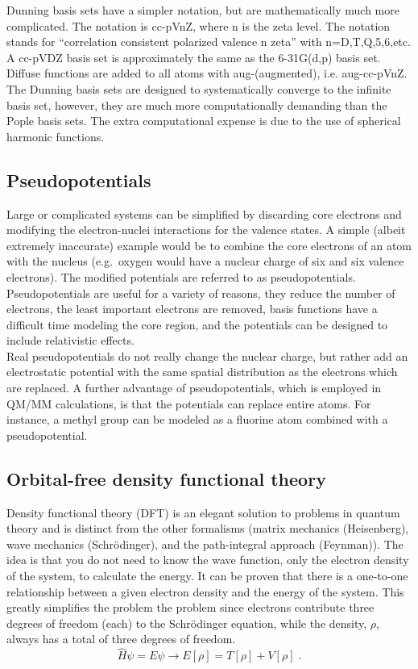 \documentclass[12pt]{report}
\begin{document}
Dunning basis sets have a simpler notation, but are mathematically much more
complicated.
The notation is cc-pVnZ, where n is the zeta level.
The notation stands for ``correlation consistent polarized valence n zeta''
with n=D,T,Q,5,6,etc.
A cc-pVDZ basis set is approximately the same as the 6-31G(d,p) basis set.
Diffuse functions are added to all atoms with aug-(augmented), i.e.
aug-cc-pVnZ.
The Dunning basis sets are designed to systematically converge to the infinite
basis set, however, they are much more computationally demanding than the
Pople basis sets.
The extra computational expense is due to the use of spherical harmonic
functions.

\subsection{Pseudopotentials}

Large or complicated systems can be simplified by discarding core electrons
and modifying the electron-nuclei interactions for the valence states.
A simple (albeit extremely inaccurate) example would be to combine the core
electrons of an atom with the nucleus (e.g.\ oxygen would have a nuclear charge
of six and six valence electrons).
The modified potentials are referred to as pseudopotentials.
Pseudopotentials are useful for a variety of reasons, they reduce the number
of electrons, the least important electrons are removed, basis functions have
a difficult time modeling the core region, and the potentials can be designed
to include relativistic effects. \\

Real pseudopotentials do not really change the nuclear charge, but rather add
an electrostatic potential with the same spatial distribution as the electrons
which are replaced.
A further advantage of pseudopotentials, which is employed in QM/MM
calculations, is that the potentials can replace entire atoms.
For instance, a methyl group can be modeled as a fluorine atom combined with a
pseudopotential.

\subsection{Orbital-free density functional theory}

Density functional theory (DFT) is an elegant solution to problems in quantum
theory and is distinct from the other formalisms (matrix mechanics
(Heisenberg), wave mechanics (Schr\"{o}dinger), and the path-integral approach
(Feynman)).
The idea is that you do not need to know the wave function, only the electron
density of the system, to calculate the energy.
It can be proven that there is a one-to-one relationship between a given
electron density and the energy of the system.
This greatly simplifies the problem the problem since electrons contribute
three degrees of freedom (each) to the Schr\"{o}dinger equation, while the
density, $\rho$, always has a total of three degrees of freedom.
\begin{equation}
 \hat H\psi=E\psi \to E[\rho] = T[\rho]+V[\rho] \; .
\end{equation}
\end{document}
